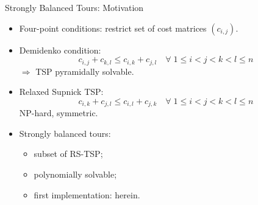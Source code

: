 \documentclass[
  size=8pt,
  style=klope,
  paper=screen,
  mode=present,
  nohandoutpagebreaks,
  pauseslide,
  hlsections,
  fleqn,
]{powerdot}
\begin{document}
\begin{slide}[toc=Strongly Balanced Tours]{Strongly Balanced Tours: Motivation}
  \begin{itemize}
  \item
  Four-point conditions: restrict set of cost matrices $\left(c_{i,j}\right)$.
  \item
    Demidenko condition:
    \begin{equation}
      c_{i,j} + c_{k,l} \leq c_{i,k} + c_{j,l} \quad
      \forall \; 1 \leq i < j < k < l \leq n
    \end{equation}
    $\Rightarrow$
    TSP pyramidally solvable.
  \item
    Relaxed Supnick TSP:
    \begin{equation}
      c_{i,k} + c_{j,l} \leq c_{i,l} + c_{j,k} \quad
      \forall \; 1 \leq i < j < k < l \leq n
    \end{equation}
    NP-hard, symmetric.
    \item
    Strongly balanced tours:
    \begin{itemize}
      \item subset of RS-TSP;
      \item polynomially solvable;
      \item first implementation: herein.
    \end{itemize}
  \end{itemize}
\end{slide}
\end{document}
